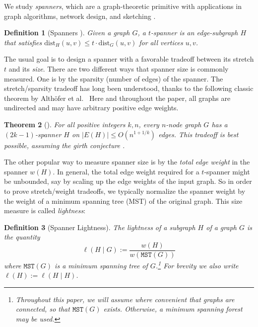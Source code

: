 \documentclass{article}\usepackage[a4paper,margin=20mm]{geometry}
\newtheorem{theorem}{Theorem}\newtheorem{lemma}[theorem]{Lemma}\newtheorem{proposition}[theorem]{Proposition}\newtheorem{corollary}[theorem]{Corollary}\newtheorem{definition}[theorem]{Definition}\newtheorem{claim}[theorem]{Claim}\newtheorem{remark}[theorem]{Remark}\newtheorem{observation}[theorem]{Observation}\newtheorem{conjecture}[theorem]{Conjecture}\newtheorem{example}[theorem]{Example}
\newcommand{\dist}{\text{dist}}
\newcommand{\Althofer}{Alth\"{o}fer}
\newcommand{\mst}{\texttt{MST}}
\begin{document}
We study \emph{spanners}, which are a graph-theoretic primitive with applications in graph algorithms, network design, and sketching \cite{ABSHJKS20}.
\begin{definition}[Spanners \cite{PU89jacm,PU89sicomp}]
Given a graph $G$, a $t$-spanner is an edge-subgraph $H$ that satisfies
$\dist_H(u, v) \le t \cdot \dist_G(u, v)$ for all vertices $u, v$.
\end{definition}

The usual goal is to design a spanner with a favorable tradeoff between its stretch $t$ and its \emph{size}.
There are two different ways that spanner size is commonly measured.
One is by the sparsity (number of edges) of the spanner.
The stretch/sparsity tradeoff has long been understood, thanks to the following classic theorem by \Althofer{} et al.~\cite{ADDJS93}
Here and throughout the paper, all graphs are undirected and may have arbitrary positive edge weights.
\begin{theorem} [\cite{ADDJS93}] \label{thm:sotasparse}
For all positive integers $k, n$, every $n$-node graph $G$ has a $(2k-1)$-spanner $H$ on $|E(H)| \le O(n^{1+1/k})$ edges.
This tradeoff is best possible, assuming the girth conjecture \cite{girth}.
\end{theorem}

The other popular way to measure spanner size is by the \emph{total edge weight} in the spanner $w(H)$.
In general, the total edge weight required for a $t$-spanner might be unbounded, say by scaling up the edge weights of the input graph.
So in order to prove stretch/weight tradeoffs, we typically normalize the spanner weight by the weight of a minimum spanning tree (MST) of the original graph.
This size measure is called \emph{lightness}:
\begin{definition} [Spanner Lightness]
The lightness of a subgraph $H$ of a graph $G$ is the quantity
$$\ell(H \mid G) := \frac{w(H)}{w(\mst(G))}$$
where $\mst(G)$ is a minimum spanning tree of $G$.\footnote{Throughout this paper, we will assume where convenient that graphs are connected, so that $\mst(G)$ exists.  Otherwise, a minimum spanning forest may be used.}
For brevity we also write $\ell(H) := \ell(H \mid H)$.
\end{definition}
\end{document}
